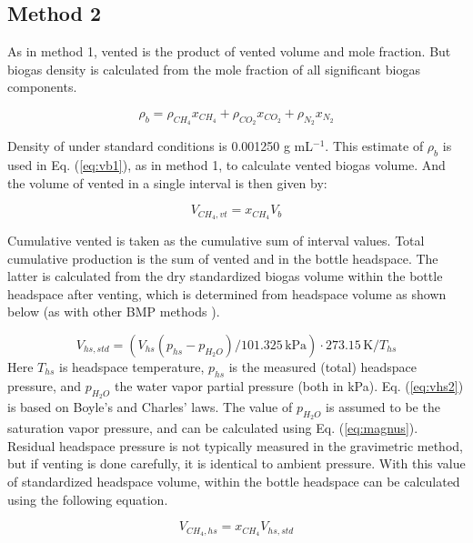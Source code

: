 \documentclass[]{article}
\newcommand{\unit}[1]{\ensuremath{\, \mathrm{#1}}}
\begin{document}
\subsection{Method 2}
As in method 1, vented  is the product of vented volume and  mole fraction.
But biogas density is calculated from the mole fraction of all significant biogas components.

\begin{equation}
  \label{eq:dens2}
  \rho_b = \rho_{CH_4} x_{CH_4} + \rho_{CO_2} x_{CO_2} + \rho_{N_2} x_{N_2}
\end{equation}

Density of  under standard conditions is 0.001250 g mL$^{-1}$.
This estimate of $\rho_b$ is used in Eq. (\ref{eq:vb1}), as in method 1, to calculate vented biogas volume.
And the volume of vented  in a single interval is then given by:

\begin{equation}
  \label{eq:vvch42}
  V_{CH_4,vt} = x_{CH_4} V_b
\end{equation}

Cumulative vented  is taken as the cumulative sum of interval values. 
Total cumulative  production is the sum of vented  and  in the bottle headspace.
The latter is calculated from the dry standardized biogas volume within the bottle headspace after venting, which is determined from headspace volume as shown below (as with other BMP methods \cite{bmpmethods}).

\begin{equation}
  \label{eq:vhs2}
  V_{hs,std} = ( V_{hs}(p_{hs} - p_{H_2O})/101.325 \unit{kPa} ) \cdot 273.15 \unit{K}/T_{hs}
\end{equation}
Here $T_{hs}$ is headspace temperature, $p_{hs}$ is the measured (total) headspace pressure, and $p_{H_2O}$ the water vapor partial pressure (both in kPa).
Eq. (\ref{eq:vhs2}) is based on Boyle's and Charles' laws.
The value of $p_{H_2O}$ is assumed to be the saturation vapor pressure, and can be calculated using Eq. (\ref{eq:magnus}).
Residual headspace pressure is not typically measured in the gravimetric method, but if venting is done carefully, it is identical to ambient pressure.
With this value of standardized headspace volume,  within the bottle headspace can be calculated using the following equation.

\begin{equation}
  \label{eq:vch4hs2}
  V_{CH_4,hs} = x_{CH_4} V_{hs,std}
\end{equation}
\end{document}
